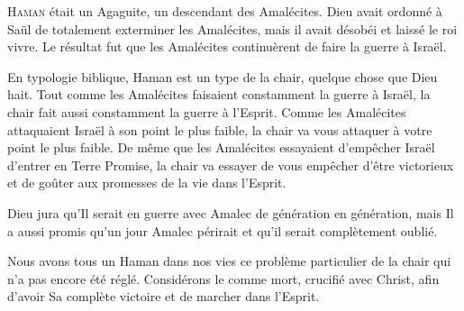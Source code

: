 \lettrine{H}{aman} était un Agaguite, un descendant des Amalécites.
 Dieu avait ordonné à Saül de totalement exterminer les Amalécites,
 mais il avait désobéi et laissé le roi vivre.
 Le résultat fut que les Amalécites continuèrent de faire la guerre à Israël.

En typologie
 biblique, Haman est un type de la chair,
 quelque chose que Dieu hait.
 Tout comme les Amalécites faisaient constamment la guerre à Israël,
 la chair fait aussi constamment la guerre à l'Esprit.
 Comme les Amalécites attaquaient Israël à son point le plus faible,
 la chair va vous attaquer à votre point le plus faible.
 De même que les Amalécites essayaient d'empêcher Israël
 d'entrer en Terre Promise, la chair va essayer de vous empêcher
 d'être victorieux et de goûter aux promesses de la vie dans l'Esprit.

Dieu jura qu'Il serait en guerre avec Amalec de génération en génération,
 mais Il a aussi promis qu'un jour Amalec périrait et
 qu'il serait complètement oublié.


Nous avons tous un Haman dans nos vies
 \ocadr{}ce problème particulier de la chair
 qui n'a pas encore été réglé.
 Considérons le comme mort, crucifié avec Christ,
 afin d'avoir Sa complète victoire et de marcher dans l'Esprit.

\dvrule







